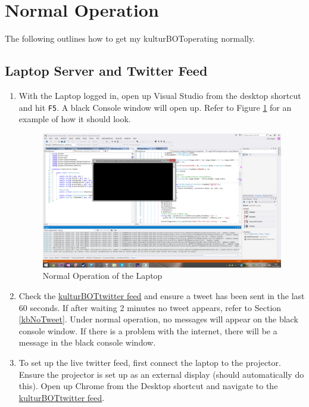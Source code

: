 \documentclass[]{article}
\newcommand{\kb}{kulturBOT}
\newcommand{\kbspace}{\kb \space}
\newcommand{\mykb}{my \kb}
\newcommand{\mykbspace}{\mykb \space}
\begin{document}
\section{Normal Operation}
The following outlines how to get \mykbspace operating normally.

\subsection{Laptop Server and Twitter Feed}
\begin{enumerate}
	\item With the Laptop logged in, open up Visual Studio from the desktop shortcut and hit \texttt{F5}. A black Console window will open up. Refer to Figure \ref{normalVS} for an example of how it should look.
	
	\begin{figure}[h!]
		\centering
	    \includegraphics[width=1\textwidth]{img/normalVSlook.png}
	    \caption{Normal Operation of the Laptop}
	    \label{normalVS}
	\end{figure}
	
	\item Check the \href{https://twitter.com/kulturBOT}{\kbspace twitter feed} and ensure a tweet has been sent in the last 60 seconds. If after waiting 2 minutes no tweet appears, refer to Section \ref{kbNoTweet}. Under normal operation, no messages will appear on the black console window. If there is a problem with the internet, there will be a message in the black console window.
	
	\item To set up the live twitter feed, first connect the laptop to the projector. Ensure the projector is set up as an external display (should automatically do this). Open up Chrome from the Desktop shortcut and navigate to the \href{https://twitter.com/kulturBOT}{\kbspace twitter feed}.
	

\end{enumerate}
\end{document}
